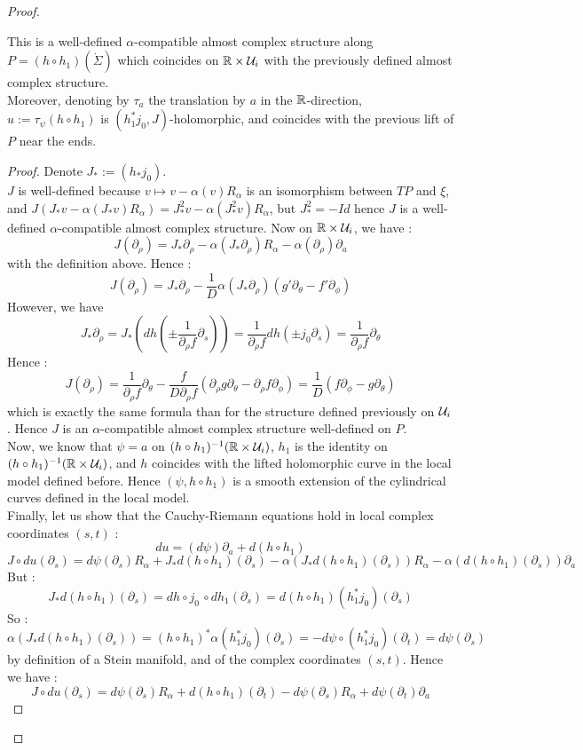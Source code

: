 \documentclass[../main.tex]{subfiles}
\begin{document}
\begin{proof}
\begin{lemma}\label{l:technical_stein_gluing}{\text{  }}

\noindent This is a well-defined $\alpha$-compatible almost complex structure along $P = (h\circ h_1)(\dot\Sigma)$ which coincides on $\mathbb{R}\times \mathcal{U}_i$ with the previously defined almost complex structure.\\ Moreover, denoting by $\tau_a$ the translation by $a$ in the $\mathbb{R}$-direction, $u := \tau_\psi (h\circ h_1)$ is $(h_1^*j_0,J)$-holomorphic, and coincides with the previous lift of $P$ near the ends. 

\end{lemma}

\begin{proof}

Denote $J_* := (h_*j_0)$.\\
$J$ is well-defined because $v\mapsto v-\alpha(v)R_\alpha$ is an isomorphism between $TP$ and $\xi$, and $J(J_*v - \alpha(J_*v)R_\alpha) = J_*^2v - \alpha(J_*^2v)R_\alpha$, but $J_*^2 = -Id$ hence $J$ is a well-defined $\alpha$-compatible almost complex structure. Now on $\mathbb{R}\times \mathcal{U}_i$, we have : $$J(\partial_\rho) = J_*\partial_\rho - \alpha(J_*\partial_\rho)R_\alpha - \alpha(\partial_\rho)\partial_a$$ with the definition above. Hence : $$J(\partial_\rho) = J_*\partial_\rho - \frac{1}{D}\alpha(J_*\partial_\rho)(g'\partial_\theta - f'\partial_\phi)$$
However, we have $$J_* \partial_\rho = J_*(dh(\pm\frac{1}{\partial_\rho f}\partial_s)) = \frac{1}{\partial_\rho f}dh(\pm j_0\partial_s) = \frac{1}{\partial_\rho f}\partial_\theta$$
Hence :
$$J(\partial_\rho) = \frac{1}{\partial_\rho f}\partial_\theta - \frac{f}{D\partial_\rho f} (\partial_\rho g \partial_\theta - \partial_\rho f\partial_\phi) = \frac{1}{D}(f\partial_\phi- g\partial_\theta)$$
which is exactly the same formula than for the structure defined previously on $\mathcal{U}_i$. Hence $J$ is an $\alpha$-compatible almost complex structure well-defined on $P$. \\
Now, we know that $\psi = a$ on $(h\circ h_1)^{-1}(\mathbb{R}\times \mathcal{U}_i)$, $h_1$ is the identity on $(h\circ h_1)^{-1}(\mathbb{R}\times \mathcal{U}_i)$, and $h$ coincides with the lifted holomorphic curve in the local model defined before. Hence $(\psi,h\circ h_1)$ is a smooth extension of the cylindrical curves defined in the local model. \\

Finally, let us show that the Cauchy-Riemann equations hold in local complex coordinates $(s,t)$ : 
$$du = (d\psi)\partial_a + d(h\circ h_1)$$
$$J\circ du(\partial_s) = d\psi(\partial_s)R_\alpha + J_*d(h\circ h_1)(\partial_s) - \alpha(J_*d(h\circ h_1)(\partial_s))R_\alpha - \alpha(d(h\circ h_1)(\partial_s))\partial_a$$
But :
$$J_*d(h\circ h_1)(\partial_s) = dh\circ j_0\,\circ dh_1(\partial_s) = d(h\circ h_1)(h_1^*j_0)(\partial_s)$$
So :
$$\alpha(J_* d(h\circ h_1)(\partial_s)) = (h\circ h_1)^*\alpha(h_1^*j_0)(\partial_s) = -d\psi\circ (h_1^*j_0)(\partial_t) = d\psi(\partial_s)$$
by definition of a Stein manifold, and of the complex coordinates $(s,t)$. Hence we have :
$$J\circ du(\partial_s) = d\psi(\partial_s)R_\alpha + d(h\circ h_1)(\partial_t) -d\psi(\partial_s)R_\alpha + d\psi(\partial_t)\partial_a $$


\end{proof}
\end{proof}
\end{document}
